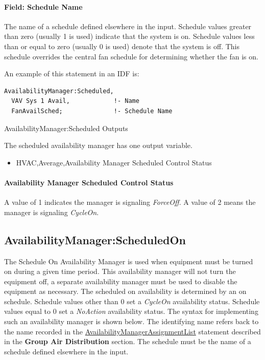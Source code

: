 \paragraph{Field: Schedule Name}\label{field-schedule-name-006}

The name of a schedule defined elsewhere in the input. Schedule values greater than zero (usually 1 is used) indicate that the system is on. Schedule values less than or equal to zero (usually 0 is used) denote that the system is off. This schedule overrides the central fan schedule for determining whether the fan is on.

An example of this statement in an IDF is:

\begin{lstlisting}
AvailabilityManager:Scheduled,
  VAV Sys 1 Avail,            !- Name
  FanAvailSched;              !- Schedule Name
\end{lstlisting}

AvailabilityManager:Scheduled Outputs

The scheduled availability manager has one output variable.

\begin{itemize}
\tightlist
\item
  HVAC,Average,Availability Manager Scheduled Control Status
\end{itemize}

\paragraph{Availability Manager Scheduled Control Status}\label{availability-manager-scheduled-control-status}

A value of 1 indicates the manager is signaling \emph{ForceOff}. A value of 2 means the manager is signaling \emph{CycleOn}.

\subsection{AvailabilityManager:ScheduledOn}\label{availabilitymanagerscheduledon}

The Schedule On Availability Manager is used when equipment must be turned on during a given time period. This availability manager will not turn the equipment off, a separate availability manager must be used to disable the equipment as necessary. The scheduled on availability is determined by an on schedule. Schedule values other than 0 set a \emph{CycleOn} availability status. Schedule values equal to 0 set a \emph{NoAction} availability status. The syntax for implementing such an availability manager is shown below. The identifying name refers back to the name recorded in the \hyperref[availabilitymanagerassignmentlist]{AvailabilityManagerAssignmentList} statement described in the \textbf{Group Air Distribution} section. The schedule must be the name of a schedule defined elsewhere in the input.

